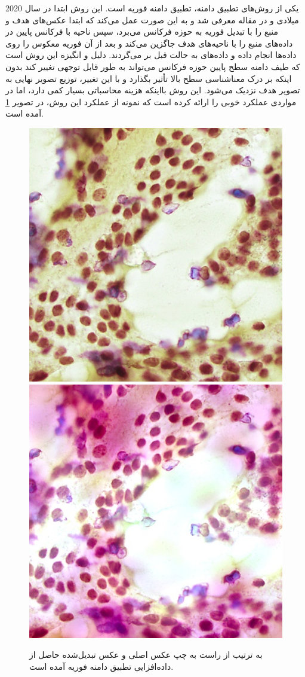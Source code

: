 یکی از روش‌های تطبیق دامنه، تطبیق دامنه فوریه است. این روش ابتدا در سال 2020 میلادی و در مقاله \cite{yang2020fda} معرفی شد و به این صورت عمل می‌کند که ابتدا عکس‌های هدف و منبع را با تبدیل فوریه به حوزه فرکانس می‌برد، سپس ناحیه با فرکانس پایین در داده‌های منبع را با ناحیه‌های هدف جاگزین می‌کند و بعد از آن فوریه معکوس را روی داده‌ها انجام داده و داده‌های به حالت قبل بر می‌گردند. دلیل و انگیزه این روش است که طیف دامنه سطح پایین حوزه فرکانس می‌تواند به طور قابل توجهی تغییر کند بدون اینکه بر درک معناشناسی سطح بالا تأثیر بگذارد و با این تغییر، توزیع تصویر نهایی به تصویر هدف نزدیک می‌شود.
این روش بااینکه هزینه محاسباتی بسیار کمی دارد، اما در مواردی عملکرد خوبی را ارائه کرده است که نمونه از عملکرد این روش، در تصویر \ref{fda augmentation} آمده است.
\begin{figure}
    \begin{center}
        \includegraphics[width=0.48\linewidth]{figs/suggested_methods/subs/data_augmentation/fda_1054-original.jpeg}
        \includegraphics[width=0.48\linewidth]{figs/suggested_methods/subs/data_augmentation/fda_1054-transformed.jpeg}
    \end{center}
    \caption[نمونه‌ای از داده‌افزایی تطبیق دامنه فوریه]{ به ترتیب از راست به چپ عکس اصلی و عکس تبدیل‌شده حاصل از داده‌افزایی تطبیق دامنه فوریه آمده است.}
    \label{fda augmentation}
\end{figure}

